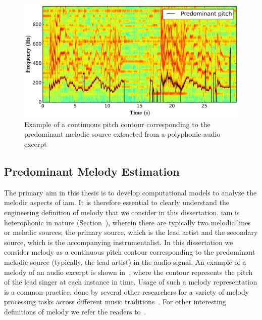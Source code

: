 {\begin{figure}
	\begin{center}
		\includegraphics[width=\figSizeHundred]{ch05_preprocessing/figures/predominantMelodyExample.png}
	\end{center}
	\caption{Example of a continuous pitch contour corresponding to the predominant melodic source extracted from a polyphonic audio excerpt}
	\label{fig:predominant_melodic_fragment}
\end{figure}


\subsection{Predominant Melody Estimation}
\label{sec:data_preprocessing_predominant_melody_estimation}

The primary aim in this thesis is to develop computational models to analyze the melodic aspects of \gls{iam}. It is therefore essential to clearly understand the engineering definition of melody that we consider in this dissertation. \Gls{iam} is heterophonic in nature (Section~), wherein there are typically two melodic lines or melodic sources; the primary source, which is the lead artist and the secondary source, which is the accompanying instrumentalist. In this dissertation we consider melody as a continuous pitch contour corresponding to the predominant melodic source (typically, the lead artist) in the audio signal. An example of a melody of an audio excerpt is shown in~, where the contour represents the pitch of the lead singer at each instance in time. Usage of such a melody representation is a common practice, done by several other researchers for a variety of melody processing tasks across different music traditions~\citep{Dutta2014,Ishwar2013,Rao2014,koduri2014intonation,senturk2013score,pikrakis2012tracking}.  For other interesting definitions of melody we refer the readers to~\citep{Salamon2012}. 


}
